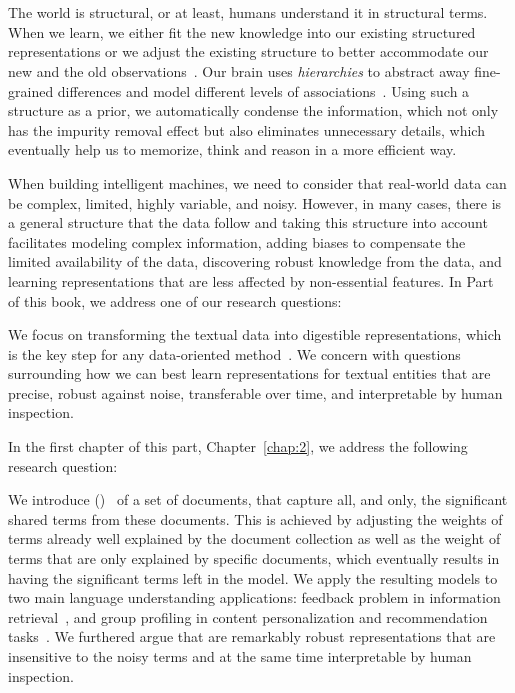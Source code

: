 \part{}
\label{part1}
%
The world is structural, or at least, humans understand it in structural terms. When we learn, we either fit the new knowledge into our existing structured representations or we adjust the existing structure to better accommodate our new and the old observations~\citep{battaglia2018relational}.
%
Our brain uses \emph{hierarchies} to abstract away fine-grained differences and model different levels of associations~\citep{Ballard:2015}. Using such a structure as a prior, we automatically condense the information, which not only has the impurity removal effect but also eliminates unnecessary details, which eventually help us to memorize, think and reason in a more efficient way.

When building intelligent machines, we need to consider that real-world data can be complex, limited, highly variable, and noisy. However, in many cases, there is a general structure that the data follow and taking this structure into account facilitates modeling complex information, adding biases to compensate the limited availability of the data, discovering robust knowledge from the data, and learning representations that are less affected by non-essential features. 
%
In Part~\ref{part1} of this book, we address one of our research questions:

We focus on transforming the textual data into digestible representations, which is the key step for any data-oriented method~\citep{Bengio:2013}. We concern with questions surrounding how we can best learn representations for textual entities that are precise, robust against noise, transferable over time, and interpretable by human inspection.  

In the first chapter of this part, Chapter~\ref{chap:2}, we address the following research question:

We introduce \emph{\swlms} (\acswlm)~\citep{Dehghani:2016:SIGIR} of a set of documents, that capture all, and only, the significant shared terms from these documents.  This is achieved by adjusting the weights of terms already well explained by the document collection as well as the weight of terms that are only explained by specific documents, which eventually results in having the significant terms left in the model. 
We apply the resulting models to two main language understanding applications: feedback problem in information retrieval~\citep{Dehghani:CIKM2016:long, Dehghani:CIKM2016:short}, and group profiling in content personalization and recommendation tasks~\citep{Dehghani:2016:CHIIR,Dehghani2016:trec}. We furthered argue that \acswlm are remarkably robust representations that are insensitive to the noisy terms and at the same time interpretable by human inspection. 

